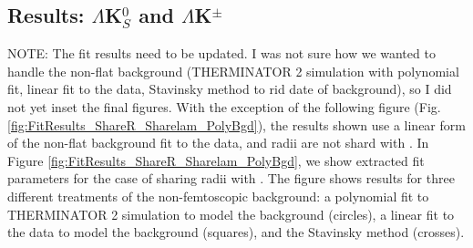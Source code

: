 \documentclass[../AnalysisNoteJBuxton.tex]{subfiles}
\begin{document}
\subsection{Results: \texorpdfstring{$\Lambda$K$^{0}_{S}$ and $\Lambda$K$^{\pm}$}{TEXT}}
\label{ResultsLamK}

NOTE: The fit results need to be updated.  I was not sure how we wanted to handle the non-flat background (THERMINATOR 2 simulation with polynomial fit, linear fit to the data, Stavinsky method to rid date of background), so I did not yet inset the final figures.  With the exception of the following figure (Fig. \ref{fig:FitResults_ShareR_Sharelam_PolyBgd}), the results shown use a linear form of the non-flat background fit to the data, and \LamKchPALamKchM radii are not shard with \LamKchMALamKchP.  In Figure \ref{fig:FitResults_ShareR_Sharelam_PolyBgd}, we show extracted fit parameters for the case of \LamKchPALamKchM sharing radii with \LamKchMALamKchP.  The figure shows results for three different treatments of the non-femtoscopic background: a polynomial fit to THERMINATOR 2 simulation to model the background (circles), a linear fit to the data to model the background (squares), and the Stavinsky method (crosses).
\end{document}
